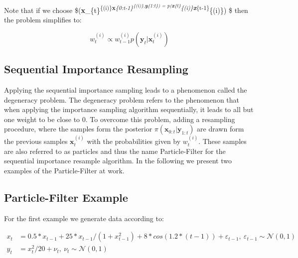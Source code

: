 \documentclass[
]{article}
\begin{document}
Note that if we choose
\$\pi(\textbf{x}\_\{t\}\textsuperscript{\{(i)\}\textbar{}\textbf{x}\emph{\{0:t-1\}\textsuperscript{\{(i)\},\textbf{y}\emph{\{1:t\})
= p(\textbf{x}}\{t\}}\{(i)\}\textbar{}\textbf{x}}\{t-1\}}\{(i)\}) \$
then the problem simplifies to:

\[
\begin{equation*}
        w_t^{(i)} \propto  w_{t-1}^{(i)} p(\textbf{y}_{t}|\textbf{x}_{t}^{(i)})
\end{equation*}
\]

\hypertarget{sequential-importance-resampling}{%
\subsection{Sequential Importance
Resampling}\label{sequential-importance-resampling}}

Applying the sequential importance sampling leads to a phenomenon called
the degeneracy problem. The degeneracy problem refers to the phenomenon
that when applying the importance sampling algorithm sequentially, it
leads to all but one weight to be close to \(0\). To overcome this
problem, adding a resampling procedure, where the samples form the
posterior \(\pi(\textbf{x}_{0:t}|\textbf{y}_{1:t})\) are drawn form the
previous samples \(\textbf{x}_t^{(i)}\) with the probabilities given by
\(w_t^{(i)}\). These samples are also referred to as particles
\citep{sarkka2013bayesian} and thus the name Particle-Filter for the
sequential importance resample algorithm. In the following we present
two examples of the Particle-Filter at work.

\hypertarget{particle-filter-example}{%
\subsection{Particle-Filter Example}\label{particle-filter-example}}

For the first example we generate data according to:

\[
\begin{equation*}
    \begin{aligned}
        x_t  &= 0.5*x_{t-1} + 25*x_{t-1}/(1 + x_{t-1}^2) + 8*cos(1.2*(t-1)) + \varepsilon_{t-1},\ \varepsilon_{t-1} \sim \mathcal{N}(0,1)\\
        y_t  &= x_t^2/20 + \nu_t, \ \nu_t \sim \mathcal{N}(0,1)
    \end{aligned}
\end{equation*}
\]
\end{document}

